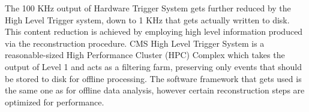 The 100 KHz output of Hardware Trigger System gets further reduced by the High Level Trigger system, down to 1 KHz that gets actually written to disk. This content reduction is achieved by employing high level information produced via the reconstruction procedure. CMS High Level Trigger System is a reasonable-sized High Performance Cluster (HPC) Complex which takes the output of Level 1 and acts as a filtering farm, preserving only events that should be stored to disk for offline processing. The software framework that gets used is the same one as for offline data analysis, however certain reconstruction steps are optimized for performance.







